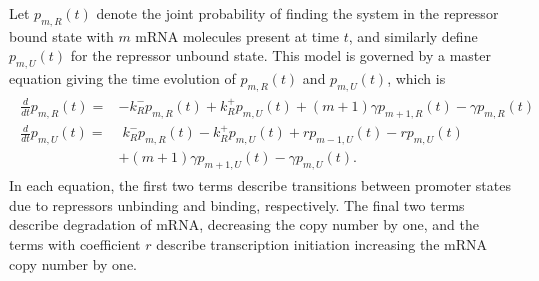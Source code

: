 \documentclass[12pt]{article}%
\newcommand{\deriv}[2][{}]{\frac{d #1}{d #2}}
\begin{document}
Let $p_{m,R}(t)$ denote the joint probability of finding the
system in the repressor bound state with $m$ mRNA molecules
present at time $t$, and similarly define $p_{m,U}(t)$ for the
repressor unbound state. 
This model is governed by a master equation giving the time
evolution of $p_{m,R}(t)$ and $p_{m,U}(t)$, which is
\begin{align}
\begin{split}
\deriv{t}p_{m,R}(t) =& - k_R^- p_{m,R}(t) + k_R^+ p_{m,U}(t)
                + (m+1)\gamma p_{m+1,R}(t) - \gamma p_{m,R}(t)
\\
\deriv{t}p_{m,U}(t) =&\; k_R^- p_{m,R}(t) - k_R^+ p_{m,U}(t)
                        + rp_{m-1,U}(t) - rp_{m,U}(t)
                \\
                &+ (m+1)\gamma p_{m+1,U}(t) - \gamma p_{m,U}(t).
\end{split}
\end{align}
In each equation, the first two terms describe transitions
between promoter states due to repressors unbinding and binding,
respectively. The final two terms describe degradation of mRNA,
decreasing the copy number by one, and the terms with coefficient
$r$ describe transcription initiation increasing the mRNA copy
number by one.
\end{document}
